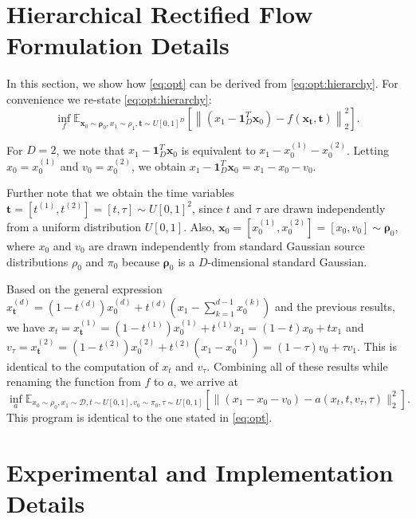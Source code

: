 




\section{Hierarchical Rectified Flow Formulation Details}
\label{sec:HRFformulationdetails}
In this section, we show how \cref{eq:opt} can be derived from \cref{eq:opt:hierarchy}.
For convenience we re-state \cref{eq:opt:hierarchy}:
\begin{equation}
\label{eq:opt:hierarchy_copy}
\inf_f \mathbb{E}_{{\bm x}_0\sim{\bm \rho}_0,x_1\sim\rho_1,{\bm t}\sim U[0,1]^D}\left[\left\|\left(x_1 - {\bm 1}_D^T{\bm x}_0\right) - f\left({\bm x}_{\bm t},{\bm t}\right)\right\|^2_2\right].
\end{equation}

For $D=2$, we note that $x_1 - {\bm 1}_D^T{\bm x}_0$ is equivalent to $x_1-x_0^{(1)}-x_0^{(2)}$. Letting $x_0 = x_0^{(1)}$ and $v_0 = x_0^{(2)}$, we obtain  $x_1 - {\bm 1}_D^T{\bm x}_0 = x_1-x_0-v_0$. 

Further note that we obtain the time variables $\bm t=[t^{(1)}, t^{(2)}]=[t, \tau]\sim U[0,1]^2$, since $t$ and $\tau$ are drawn independently  from a uniform distribution $U[0,1]$. Also, ${\bm x}_0=[x_0^{(1)},x_0^{(2)}] = [x_0, v_0]\sim {\bm \rho}_0$, where $x_0$ and $v_0$ are drawn independently from standard Gaussian source distributions $\rho_0$ and $\pi_0$ because ${\bm \rho}_0$ is a $D$-dimensional standard Gaussian. 

Based on the general expression $x^{(d)}_{\bm t} = (1-t^{(d)})x_0^{(d)} + t^{(d)}(x_1 - \sum_{k=1}^{d-1} x_0^{(k)})$ and the previous results, we have 
$x_t = x^{(1)}_{\bm t} = (1-t^{(1)})x_0^{(1)} + t^{(1)}x_1=(1-t)x_0 + tx_1$ 
and $v_{\tau}=x^{(2)}_{\bm t} = (1-t^{(2)})x_0^{(2)} + t^{(2)}(x_1-x_0^{(1)}) = (1-\tau)v_0 + \tau v_1$. This is identical to the computation of $x_t$ and $v_{\tau}$. Combining all of these results while renaming the function from $f$ to $a$, we arrive at
\begin{equation}
\label{eq:opt_copy}
\inf_a \mathbb{E}_{x_0\sim\rho_0,x_1\sim \mathcal{D},t\sim U[0,1],v_0\sim\pi_0,\tau\sim U[0,1]}\left[\|(x_1 - x_0 - v_0) - a(x_t,t,v_\tau, \tau)\|^2_2\right].
\end{equation}
This program is identical to the one stated in \cref{eq:opt}. 




\section{Experimental and Implementation Details}
\label{sec:exp_details}
